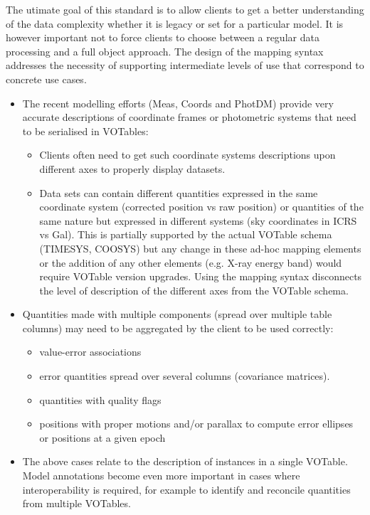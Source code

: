 
The utimate goal of this standard is to allow clients to get a better understanding of the data complexity whether it is legacy or set for a particular model. It is however important not to force clients to choose between a regular data processing and a full object approach.
The design of the mapping syntax addresses the necessity of supporting intermediate levels of use that correspond to concrete use cases.

\begin{itemize}
  \item The recent modelling efforts (Meas, Coords and PhotDM) provide very accurate descriptions of coordinate frames or photometric 
        systems that need to be serialised in VOTables:
  \begin{itemize}
    \item Clients often need to get such coordinate systems descriptions upon different axes to properly display datasets. 
    \item Data sets can contain different quantities expressed in the same coordinate system (corrected position vs raw position) or 
          quantities of the same nature but expressed in different systems (sky coordinates in ICRS vs Gal). 
          This is partially supported by the actual VOTable schema (TIMESYS, COOSYS) but any change in these ad-hoc mapping 
          elements or the addition of any other elements (e.g. X-ray energy band) would require VOTable version upgrades. 
          Using the mapping syntax disconnects the level of description of the different axes from the VOTable schema.           
  \end{itemize} 
  
  \item Quantities made with multiple components (spread over multiple table columns) may need to be aggregated by the client to be used correctly:
  \begin{itemize}
    \item value-error associations
    \item error quantities spread over several columns (covariance matrices). 
    \item quantities with quality flags
    \item positions with proper motions and/or parallax to compute error ellipses or positions at a given epoch
  \end{itemize} 

  \item The above cases relate to the description of instances in a
  single VOTable. Model annotations become even more important in cases
  where interoperability is required, for example to identify and
  reconcile quantities from multiple VOTables.


\end{itemize}
